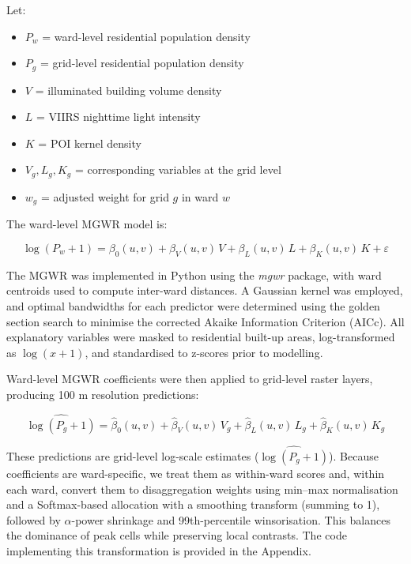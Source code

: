 \documentclass[
  12pt,
  oneside]{book}
\providecommand{\tightlist}{%
  \setlength{\itemsep}{0pt}\setlength{\parskip}{0pt}}
\begin{document}
Let:

\begin{itemize}
\tightlist
\item
  \(P_w\) = ward-level residential population density
\item
  \(P_g\) = grid-level residential population density
\item
  \(V\) = illuminated building volume density
\item
  \(L\) = VIIRS nighttime light intensity
\item
  \(K\) = POI kernel density
\item
  \(V_g, L_g, K_g\) = corresponding variables at the grid level
\item
  \(w_g\) = adjusted weight for grid \(g\) in ward \(w\)
\end{itemize}

The ward-level MGWR model is:

\begin{equation} 
  \log(P_w + 1) = \beta_0(u,v) + \beta_V(u,v) \, V + \beta_L(u,v) \, L + \beta_K(u,v) \, K + \varepsilon
  \label{eq:MWGRward}
\end{equation}

The MGWR was implemented in Python using the \emph{mgwr} package, with ward centroids used to compute inter-ward distances. A Gaussian kernel was employed, and optimal bandwidths for each predictor were determined using the golden section search to minimise the corrected Akaike Information Criterion (AICc). All explanatory variables were masked to residential built-up areas, log-transformed as \(\log(x+1)\), and standardised to z-scores prior to modelling.

Ward-level MGWR coefficients were then applied to grid-level raster layers, producing 100 m resolution predictions:

\begin{equation} 
\widehat{\log(P_g + 1)} = \hat{\beta}_0(u,v) + \hat{\beta}_V(u,v) \, V_g + \hat{\beta}_L(u,v) \, L_g + \hat{\beta}_K(u,v) \, K_g
  \label{eq:MWGRgrid}
\end{equation}

These predictions are grid-level log-scale estimates (\(\widehat{\log(P_g+1)}\)). Because coefficients are ward-specific, we treat them as within-ward scores and, within each ward, convert them to disaggregation weights using min--max normalisation and a Softmax-based allocation with a smoothing transform (summing to 1), followed by \(\alpha\)-power shrinkage and 99th-percentile winsorisation. This balances the dominance of peak cells while preserving local contrasts. The code implementing this transformation is provided in the Appendix.
\end{document}

